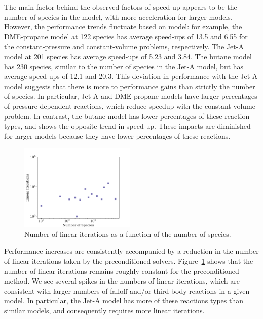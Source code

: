 \documentclass[twocolumn,10pt]{article}
\begin{document}
The main factor behind the observed factors of speed-up appears to be the number of species in the model, with more acceleration for larger models.
However, the performance trends fluctuate based on model: for example, the DME-propane model at 122 species has average speed-ups of 13.5 and 6.55 for the constant-pressure and constant-volume problems, respectively.
The Jet-A model at 201 species has average speed-ups of 5.23 and 3.84.
The butane model has 230 species, similar to the number of species in the Jet-A model, but has average speed-ups of 12.1 and 20.3.
This deviation in performance with the Jet-A model suggests that there is more to performance gains than strictly the number of species.
In particular, Jet-A and DME-propane models have larger percentages of pressure-dependent reactions, which reduce speedup with the constant-volume problem.
In contrast, the butane model has lower percentages of these reaction types, and shows the opposite trend in speed-up.
These impacts are diminished for larger models because they have lower percentages of these reactions.


\begin{figure}[htb]
\centering
\includegraphics[width=0.49\textwidth]{figures/LinIters-Nspecies-pressure_problem.pdf}
\caption{Number of linear iterations as a function of the number of species.}
\label{fig:lin-iters-log}
\end{figure}

Performance increases are consistently accompanied by a reduction in the number of linear iterations taken by the preconditioned solvers.
Figure~\ref{fig:lin-iters-log} shows that the number of linear iterations remains roughly constant for the preconditioned method.
We see several spikes in the numbers of linear iterations, which are consistent with larger numbers of falloff and/or third-body reactions in a given model.
In particular, the Jet-A model has more of these reactions types than similar models, and consequently requires more linear iterations.
\end{document}
